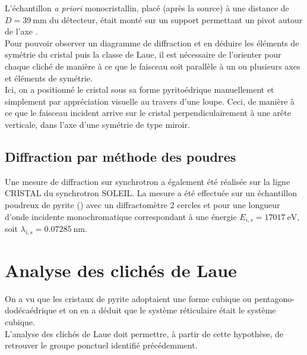 L'échantillon \textit{a priori} monocristallin, placé (après la source) à une distance de \(D = \SI{39}{\milli\metre}\) du détecteur, était monté sur un support permettant un pivot autour de l'axe \hmn{[hkl]}.\\
Pour pouvoir observer un diagramme de diffraction et en déduire les éléments de symétrie du cristal puis la classe de Laue, il est nécessaire de l'orienter pour chaque cliché de manière à ce que le faisceau soit parallèle à un ou plusieurs axes et éléments de symétrie.\\
Ici, on a positionné le cristal sous sa forme pyritoédrique manuellement et simplement par appréciation visuelle au travers d'une loupe. Ceci, de manière à ce que le faisceau incident arrive sur le cristal perpendiculairement à une arête verticale, dans l'axe d'une symétrie de type miroir.\\

\subsection{Diffraction par méthode des poudres}

Une mesure de diffraction sur synchrotron a également été réalisée sur la ligne CRISTAL du synchrotron SOLEIL. La mesure a été effectuée sur un échantillon poudreux de pyrite () avec un diffractomètre 2 cercles et pour une longueur d'onde incidente monochromatique correspondant à une énergie \(E_{i,s} = \SI{17017}{\electronvolt}\), soit \(\lambda_{i,s} = \SI{0.07285}{\nano\metre}\).

\section{Analyse des clichés de Laue}

On a vu que les cristaux de pyrite  adoptaient une forme cubique ou pentagono-dodécaédrique et on en a déduit que le système réticulaire était le système cubique. \\
L'analyse des clichés de Laue doit permettre, à partir de cette hypothèse, de retrouver le groupe ponctuel identifié précédemment.

